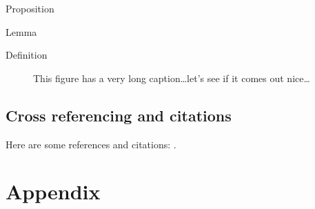 \documentclass[english,counters by chapter]{uniud}
\begin{document}
\begin{proposition}
	\label{prop:first}
	Proposition
\end{proposition}

\begin{lemma}
	\label{lem:first}
	Lemma
\end{lemma}

\begin{definition}
	\label{def:first}
	Definition
\end{definition}

\begin{remark}
	\label{rem:first}
	\blindtext[1]
\end{remark}

\begin{figure}[t]
	\begin{center}
	\end{center}
	\caption{This figure has a very long caption\dots let's see if it comes out nice\dots}
	\label{fig:first}
\end{figure}

\section{Cross referencing and citations}

Here are some references and citations:   \cite{article,book,booklet,conference,inbook,incollection,manual,mastersthesis,misc,phdthesis,proceedings,techreport,unpublished}.





\printbibliography

\appendix

\chapter{Appendix}
\lipsum[1-7]
\end{document}
